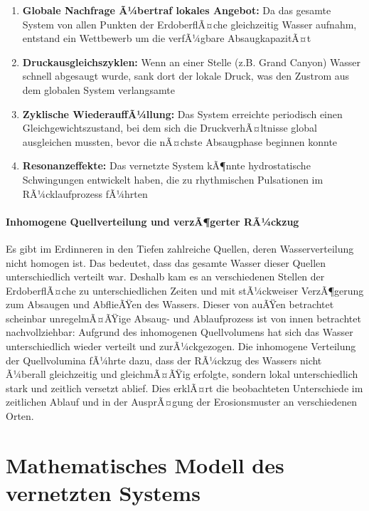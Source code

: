 ﻿\documentclass[12pt,a4paper]{report}
\begin{document}
\begin{enumerate}
	\item \textbf{Globale Nachfrage Ã¼bertraf lokales Angebot:} Da das gesamte System von allen Punkten der ErdoberflÃ¤che gleichzeitig Wasser aufnahm, entstand ein Wettbewerb um die verfÃ¼gbare AbsaugkapazitÃ¤t
	
	\item \textbf{Druckausgleichszyklen:} Wenn an einer Stelle (z.B. Grand Canyon) Wasser schnell abgesaugt wurde, sank dort der lokale Druck, was den Zustrom aus dem globalen System verlangsamte
	
	\item \textbf{Zyklische WiederauffÃ¼llung:} Das System erreichte periodisch einen Gleichgewichtszustand, bei dem sich die DruckverhÃ¤ltnisse global ausgleichen mussten, bevor die nÃ¤chste Absaugphase beginnen konnte
	
	\item \textbf{Resonanzeffekte:} Das vernetzte System kÃ¶nnte hydrostatische Schwingungen entwickelt haben, die zu rhythmischen Pulsationen im RÃ¼cklaufprozess fÃ¼hrten
\end{enumerate}

\paragraph{Inhomogene Quellverteilung und verzÃ¶gerter RÃ¼ckzug}
Es gibt im Erdinneren in den Tiefen zahlreiche Quellen, deren Wasserverteilung nicht homogen ist. Das bedeutet, dass das gesamte Wasser dieser Quellen unterschiedlich verteilt war. Deshalb kam es an verschiedenen Stellen der ErdoberflÃ¤che zu unterschiedlichen Zeiten und mit stÃ¼ckweiser VerzÃ¶gerung zum Absaugen und AbflieÃŸen des Wassers. Dieser von auÃŸen betrachtet scheinbar unregelmÃ¤ÃŸige Absaug- und Ablaufprozess ist von innen betrachtet nachvollziehbar: Aufgrund des inhomogenen Quellvolumens hat sich das Wasser unterschiedlich wieder verteilt und zurÃ¼ckgezogen. Die inhomogene Verteilung der Quellvolumina fÃ¼hrte dazu, dass der RÃ¼ckzug des Wassers nicht Ã¼berall gleichzeitig und gleichmÃ¤ÃŸig erfolgte, sondern lokal unterschiedlich stark und zeitlich versetzt ablief. Dies erklÃ¤rt die beobachteten Unterschiede im zeitlichen Ablauf und in der AusprÃ¤gung der Erosionsmuster an verschiedenen Orten.

\section{Mathematisches Modell des vernetzten Systems}
\end{document}
